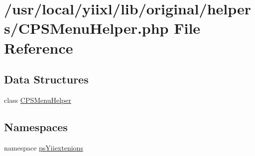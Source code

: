 \hypertarget{CPSMenuHelper_8php}{
\section{/usr/local/yiixl/lib/original/helpers/CPSMenuHelper.php File Reference}
\label{CPSMenuHelper_8php}
}
\subsection*{Data Structures}
\begin{DoxyCompactItemize}
\item 
class \hyperlink{classCPSMenuHelper}{CPSMenuHelper}
\end{DoxyCompactItemize}
\subsection*{Namespaces}
\begin{DoxyCompactItemize}
\item 
namespace \hyperlink{namespacepsYiiextenions}{psYiiextenions}
\end{DoxyCompactItemize}
